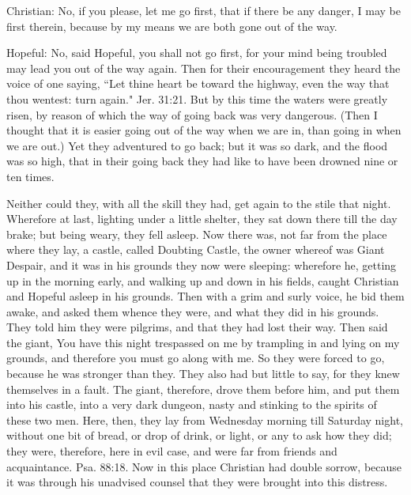 Christian: No, if you please, let me go first, that if there be any danger, I may be first therein, because by my means we are both gone out of the way.

Hopeful: No, said Hopeful, you shall not go first, for your mind being troubled may lead you out of the way again. Then for their encouragement they heard the voice of one saying, ``Let thine heart be toward the highway, even the way that thou wentest: turn again." Jer. 31:21. But by this time the waters were greatly risen, by reason of which the way of going back was very dangerous. (Then I thought that it is easier going out of the way when we are in, than going in when we are out.) Yet they adventured to go back; but it was so dark, and the flood was so high, that in their going back they had like to have been drowned nine or ten times.

Neither could they, with all the skill they had, get again to the stile that night. Wherefore at last, lighting under a little shelter, they sat down there till the day brake; but being weary, they fell asleep. Now there was, not far from the place where they lay, a castle, called Doubting Castle, the owner whereof was Giant Despair, and it was in his grounds they now were sleeping: wherefore he, getting up in the morning early, and walking up and down in his fields, caught Christian and Hopeful asleep in his grounds. Then with a grim and surly voice, he bid them awake, and asked them whence they were, and what they did in his grounds. They told him they were pilgrims, and that they had lost their way. Then said the giant, You have this night trespassed on me by trampling in and lying on my grounds, and therefore you must go along with me. So they were forced to go, because he was stronger than they. They also had but little to say, for they knew themselves in a fault. The giant, therefore, drove them before him, and put them into his castle, into a very dark dungeon, nasty and stinking to the spirits of these two men. Here, then, they lay from Wednesday morning till Saturday night, without one bit of bread, or drop of drink, or light, or any to ask how they did; they were, therefore, here in evil case, and were far from friends and acquaintance. Psa. 88:18. Now in this place Christian had double sorrow, because it was through his unadvised counsel that they were brought into this distress.


